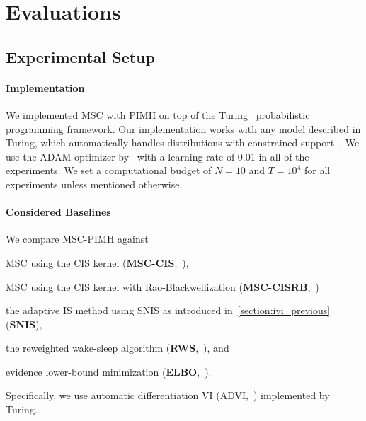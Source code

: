 

\vspace{-0.05in}
\section{Evaluations}\label{section:eval}
\subsection{Experimental Setup}
\paragraph{Implementation}
We implemented MSC with PIMH on top of the Turing~\citep{ge2018t} probabilistic programming framework.
Our implementation works with any model described in Turing, which automatically handles distributions with constrained support~\citep{JMLR:v18:16-107}.
We use the ADAM optimizer by~\citet{kingma_adam_2015} with a learning rate of 0.01 in all of the experiments.
We set a computational budget of \(N=10\) and \(T=10^4\) for all experiments unless mentioned otherwise.

\vspace{-0.1in}
\paragraph{Considered Baselines}
We compare MSC-PIMH against
\begin{enumerate*}[label=\textbf{(\roman*)}]
  \item  MSC using the CIS kernel (\textbf{MSC-CIS},~\citealt{NEURIPS2020_b2070693}), 
  \item  MSC using the CIS kernel with Rao-Blackwellization (\textbf{MSC-CISRB},~\citealt{NEURIPS2020_b2070693})
  \item the adaptive IS method using SNIS as introduced in~\cref{section:ivi_previous} (\textbf{SNIS}),
  \item the reweighted wake-sleep algorithm (\textbf{RWS},~\citealt{DBLP:journals/corr/BornscheinB14}), and  
  \item evidence lower-bound minimization (\textbf{ELBO},~\citealt{pmlr-v33-ranganath14}).
\end{enumerate*}
Specifically, we use automatic differentiation VI (ADVI,~\citealt{JMLR:v18:16-107}) implemented by Turing.

